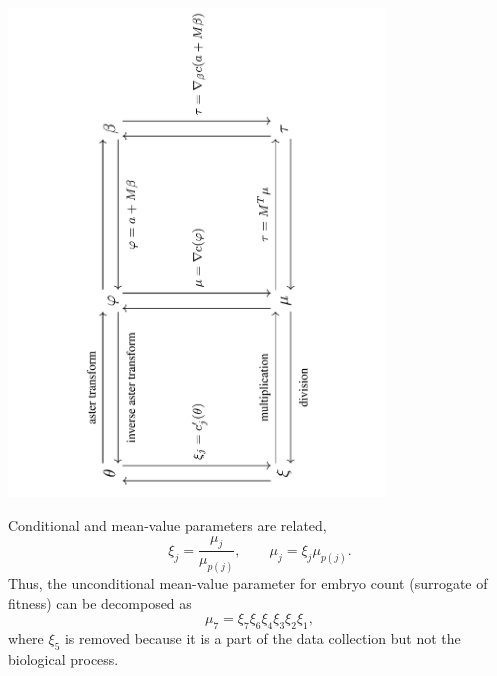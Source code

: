 \documentclass[
  ignorenonframetext,
]{beamer}
\begin{document}
\begin{frame}{}
\protect\hypertarget{section-50}{}
\begin{center}
\includegraphics[angle=270, width=0.75\textwidth]{transforms.pdf}
\end{center}
\end{frame}

\begin{frame}{}
\protect\hypertarget{section-51}{}
Conditional and mean-value parameters are related, \[
  \xi_j = \frac{\mu_j}{\mu_{p(j)}}, \qquad \mu_j = \xi_j\mu_{p(j)}.
\] Thus, the unconditional mean-value parameter for embryo count
(surrogate of fitness) can be decomposed as \[
  \mu_7 =  \xi_7\xi_6\xi_4\xi_3\xi_2\xi_1,
\] where \(\xi_5\) is removed because it is a part of the data
collection but not the biological process.
\end{frame}
\end{document}
